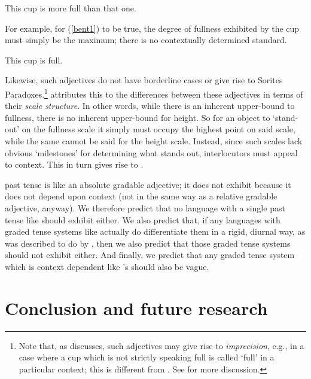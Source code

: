 \documentclass[output=paper,
modfonts
]{langscibook}
\begin{document}
\begin{exe}
\ex\label{full} This cup is more full than that one.
\end{exe}

For example, for (\ref{bent1}) to be true, the degree of fullness exhibited by the cup must simply be the maximum; there is no contextually determined standard.

\begin{exe}
\ex\label{bent1} This cup is full.
\end{exe}

Likewise, such adjectives do not have borderline cases or give rise to Sorites Paradoxes.\footnote{Note that, as \citet{kennedy07vagueness} discusses, such adjectives may give rise to \textit{imprecision}, e.g., in a case where a cup which is not strictly speaking full is called `full' in a particular context; this is different from . See \citealt{kennedy07vagueness} for more discussion.}
\citet{kennedy07vagueness} attributes this to the differences between these adjectives in terms of their \textit{scale structure}.
In other words, while there is an inherent upper-bound to fullness, there is no inherent upper-bound for height.
So for an object to `stand-out' on the fullness scale it simply must occupy the highest point on said scale, while the same cannot be said for the height scale.
Instead, since such scales lack obvious `milestones' for determining what stands out, interlocutors must appeal to context.
This in turn gives rise to .

 past tense is like an absolute gradable adjective; it does not exhibit  because it does not depend upon context (not in the same way as a relative gradable adjective, anyway).
We therefore predict that no language with a single past tense like  should exhibit  either.
We also predict that, if any languages with graded tense systems like  actually do differentiate them in a rigid, diurnal way, as  was described to do by \citet{ashton54luganda}, then we also predict that those graded tense systems should not exhibit  either. 
And finally, we predict that any graded tense system which is context dependent like 's should also be vague.

\section{Conclusion and future research}\label{sec:bochnakklecha:7}
\end{document}
